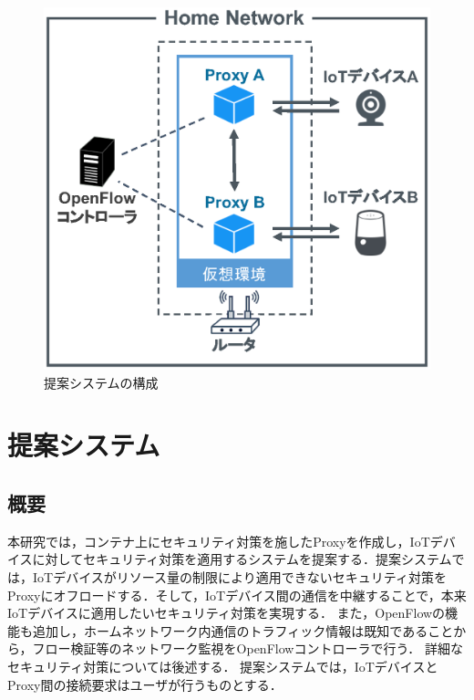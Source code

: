 \documentclass[Japanese]{dicomopapers}
\begin{document}
\begin{figure}[!tb]
	\centering
	\includegraphics[width=\linewidth]{img/system.eps}
	\caption{提案システムの構成}
	\label{fig:system}
\end{figure}


\section{提案システム}
\subsection{概要}
本研究では，コンテナ上にセキュリティ対策を施したProxyを作成し，IoTデバイスに対してセキュリティ対策を適用するシステムを提案する．提案システムでは，IoTデバイスがリソース量の制限により適用できないセキュリティ対策をProxyにオフロードする．そして，IoTデバイス間の通信を中継することで，本来IoTデバイスに適用したいセキュリティ対策を実現する．
また，OpenFlowの機能も追加し，ホームネットワーク内通信のトラフィック情報は既知であることから，フロー検証等のネットワーク監視をOpenFlowコントローラで行う．
詳細なセキュリティ対策については後述する．
提案システムでは，IoTデバイスとProxy間の接続要求はユーザが行うものとする．
\end{document}
